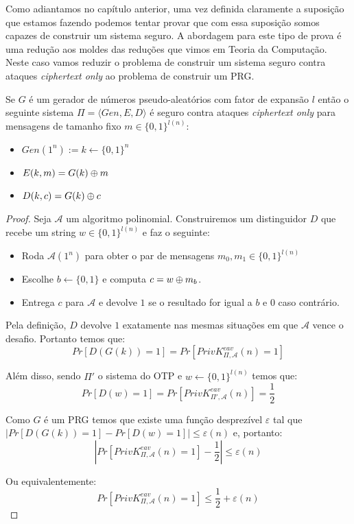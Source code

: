 Como adiantamos no capítulo anterior, uma vez definida claramente a suposição que estamos fazendo podemos tentar provar que com essa suposição somos capazes de construir um sistema seguro.
A abordagem para este tipo de prova é uma redução aos moldes das reduções que vimos em Teoria da Computação.
Neste caso vamos reduzir o problema de construir um sistema seguro contra ataques {\em ciphertext only} ao problema de construir um PRG.


\begin{theorem}
\label{theo:stream}
  Se $G$ é um gerador de números pseudo-aleatórios com fator de expansão $l$ então o seguinte sistema $\Pi = \langle Gen, E, D \rangle$ é seguro contra ataques {\em ciphertext only} para mensagens de tamanho fixo $m \in \{0,1\}^{l(n)}$:
\begin{itemize}
\item $Gen(1^n) := k \leftarrow \{0,1\}^n$
\item $E(k,m) = G(k) \oplus m$
\item $D(k,c) = G(k) \oplus c$
\end{itemize}
\end{theorem}
\begin{proof}
  Seja $\mathcal{A}$ um algoritmo polinomial.
Construiremos um distinguidor $D$ que recebe um string $w \in \{0,1\}^{l(n)}$ e faz o seguinte:
\begin{itemize}
\item Roda $\mathcal{A}(1^n)$ para obter o par de mensagens $m_0, m_1 \in \{0,1\}^{l(n)}$
\item Escolhe $b \leftarrow \{0,1\}$ e computa $c = w \oplus m_b$.
\item Entrega $c$ para $\mathcal{A}$ e devolve $1$ se o resultado for igual a $b$ e $0$ caso contrário.
\end{itemize}

Pela definição, $D$ devolve $1$ exatamente nas mesmas situações em que $\mathcal{A}$ vence o desafio.
Portanto temos que:
\begin{displaymath}
Pr[D(G(k)) = 1] = Pr[PrivK^{eav}_{\Pi, \mathcal{A}}(n) = 1]  
\end{displaymath}

Além disso, sendo $\Pi'$ o sistema do OTP e $w \leftarrow \{0,1\}^{l(n)}$ temos que:
\begin{displaymath}
Pr[D(w) = 1] = Pr[PrivK^{eav}_{\Pi', \mathcal{A}}(n)] = \frac{1}{2}  
\end{displaymath}
 
Como $G$ é um PRG temos que existe uma função desprezível $\varepsilon$ tal que $|Pr[D(G(k)) = 1] - Pr[D(w) = 1]| \leq \varepsilon(n)$ e, portanto:
\begin{displaymath}
  |Pr[PrivK^{eav}_{\Pi, \mathcal{A}}(n) = 1] - \frac{1}{2}| \leq \varepsilon(n)
\end{displaymath}

Ou equivalentemente: 
\begin{displaymath}
   Pr[PrivK^{eav}_{\Pi, \mathcal{A}}(n) = 1] \leq \frac{1}{2} + \varepsilon(n)
\end{displaymath}
\end{proof}

